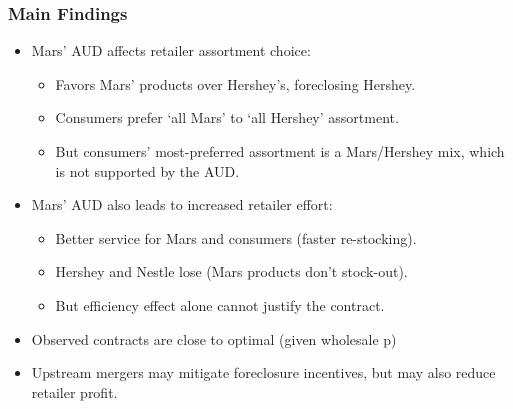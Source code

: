 \begin{frame}\frametitle{Main Findings}
\begin{itemize}
\item Mars' AUD affects retailer assortment choice:
	\begin{itemize}
	\item Favors Mars' products over Hershey's, foreclosing Hershey.
	\item Consumers prefer `all Mars' to `all Hershey' assortment.
	\item But consumers' most-preferred assortment is a Mars/Hershey mix, which is not supported by the AUD.
	\end{itemize}
\item Mars' AUD also leads to increased retailer effort:
\begin{itemize}
\item Better service for Mars and consumers (faster re-stocking).
\item Hershey and Nestle lose (Mars products don't stock-out).
\item But efficiency effect alone cannot justify the contract.
\end{itemize}
\item Observed contracts are close to optimal (given wholesale p)
\item Upstream mergers may mitigate foreclosure incentives, but may also reduce retailer profit.
\end{itemize}
\end{frame}


